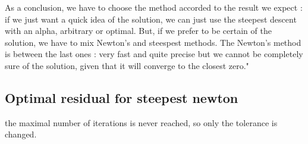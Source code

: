 \documentclass[a4paper,12pt]{article}
\begin{document}
 As a conclusion, we have to choose the method accorded to the result we expect :
 if we just want a quick idea of the solution, we can just use the steepest descent with an alpha, arbitrary or optimal. But, if we prefer to be certain of the solution, we have to mix Newton's and steespest methods.
The Newton's method is between the last ones : 
very fast and quite precise but we cannot be completely sure of the solution, given that it will converge to the closest zero." 
\subsection{Optimal residual for steepest newton}
the maximal number of iterations is never reached, so only the tolerance is changed.
\end{document}
